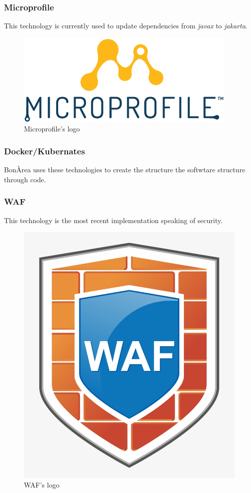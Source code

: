 \documentclass[12pt]{article}
\begin{document}
\subsubsection*{Microprofile}
This technology is currently used to update dependencies from \textit{javax} to \textit{jakarta}.
\begin{figure}[H]
    \centering
    \includegraphics[scale = 0.7]{Images/microprofile.jpg}
    \caption{Microprofile's logo}
    \label{fig:microprofile}
\end{figure}
\subsubsection*{Docker/Kubernates}
BonÀrea uses these technologies to create the structure the softwtare structure through code.
\subsubsection*{WAF}
This technology is the most recent implementation speaking of security.
\begin{figure}[H]
    \centering
    \includegraphics[scale = 0.2]{Images/waf.png}
    \caption{WAF's logo}
    \label{fig:waf}
\end{figure}
\end{document}
